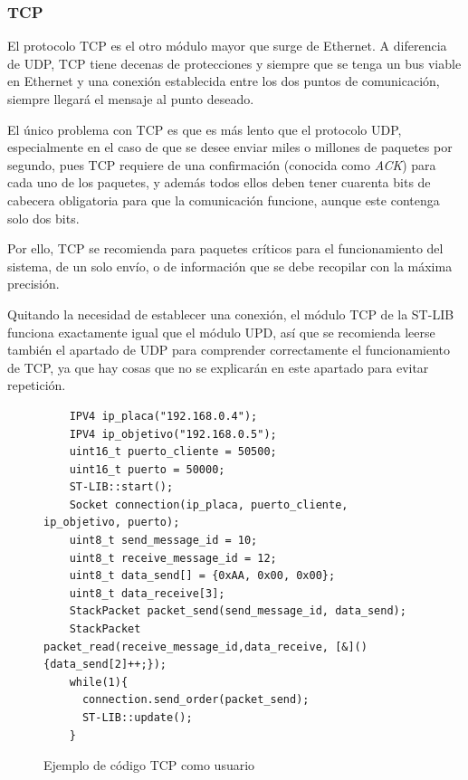 \documentclass{report}
\begin{document}
 \subsubsection{TCP}
 El protocolo TCP es el otro módulo mayor que surge de Ethernet. A diferencia de UDP, TCP tiene decenas de protecciones y siempre que se tenga un bus viable en Ethernet y una conexión establecida entre los dos puntos de comunicación, siempre llegará el mensaje al punto deseado. \par \vspace{0.3cm}
 El único problema con TCP es que es más lento que el protocolo UDP, especialmente en el caso de que se desee enviar miles o millones de paquetes por segundo, pues TCP requiere de una confirmación (conocida como \textit{ACK}) para cada uno de los paquetes, y además todos ellos deben tener cuarenta bits de cabecera obligatoria para que la comunicación funcione, aunque este contenga solo dos bits. \par 
 Por ello, TCP se recomienda para paquetes críticos para el funcionamiento del sistema, de un solo envío, o de información que se debe recopilar con la máxima precisión. \par \vspace{0.3cm}
 Quitando la necesidad de establecer una conexión, el módulo TCP de la ST-LIB funciona exactamente igual que el módulo UPD, así que se recomienda leerse también el apartado de UDP para comprender correctamente el funcionamiento de TCP, ya que hay cosas que no se explicarán en este apartado para evitar repetición. \par 

\begin{figure}[h]
  \begin{lstlisting}
    IPV4 ip_placa("192.168.0.4");
    IPV4 ip_objetivo("192.168.0.5");
    uint16_t puerto_cliente = 50500;
    uint16_t puerto = 50000;
    ST-LIB::start();
    Socket connection(ip_placa, puerto_cliente, ip_objetivo, puerto);
    uint8_t send_message_id = 10;
    uint8_t receive_message_id = 12;
    uint8_t data_send[] = {0xAA, 0x00, 0x00}; 
    uint8_t data_receive[3]; 
    StackPacket packet_send(send_message_id, data_send);
    StackPacket packet_read(receive_message_id,data_receive, [&](){data_send[2]++;});
    while(1){
      connection.send_order(packet_send);
      ST-LIB::update();
    }
  \end{lstlisting}
  \caption{Ejemplo de código TCP como usuario}
  \label{TCPuserCode}
\end{figure}
\end{document}
